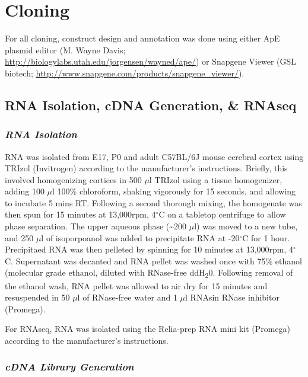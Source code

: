 \documentclass[onehalf,12pt]{beavtex}
\begin{document}
  \section{Cloning}\label{cloning}
  
  For all cloning, construct design and annotation was done using either
  ApE plasmid editor (M. Wayne Davis;
  \url{http://biologylabs.utah.edu/jorgensen/wayned/ape/}) or Snapgene
  Viewer (GSL biotech;
  \url{http://www.snapgene.com/products/snapgene_viewer/}).
  
  \subsection{RNA Isolation, cDNA Generation, \&
  RNAseq}\label{rna-isolation-cdna-generation-rnaseq}
  
  \subsubsection*{\texorpdfstring{\emph{RNA
  Isolation}}{RNA Isolation}}\label{rna-isolation}
  
  RNA was isolated from E17, P0 and adult C57BL/6J mouse cerebral cortex
  using TRIzol (Invitrogen) according to the manufacturer's instructions.
  Briefly, this involved homogenizing cortices in 500 \(\mu\)l TRIzol
  using a tissue homogenizer, adding 100 \(\mu\)l 100\% chloroform,
  shaking vigorously for 15 seconds, and allowing to incubate 5 mins RT.
  Following a second thorough mixing, the homogenate was then spun for 15
  minutes at 13,000rpm, 4\(^\circ\)C on a tabletop centrifuge to allow
  phase separation. The upper aqueous phase (\textasciitilde{}200
  \(\mu\)l) was moved to a new tube, and 250 \(\mu\)l of isoporpoanol was
  added to precipitate RNA at -20\(^\circ\)C for 1 hour. Precipitaed RNA
  was then pelleted by spinning for 10 minutes at 13,000rpm, 4\(^\circ\)C.
  Supernatant was decanted and RNA pellet was washed once with 75\%
  ethanol (molecular grade ethanol, diluted with RNase-free
  ddH\textsubscript{2}0. Following removal of the ethanol wash, RNA pellet
  was allowed to air dry for 15 minutes and resuspended in 50 \(\mu\)l of
  RNase-free water and 1 \(\mu\)l RNAsin RNase inhibitor (Promega).
  
  For RNAseq, RNA was isolated using the Relia-prep RNA mini kit (Promega)
  according to the manufacturer's instructions.
  
  \subsubsection*{\texorpdfstring{\emph{cDNA Library
  Generation}}{cDNA Library Generation}}\label{cdna-library-generation}
  
\end{document}

